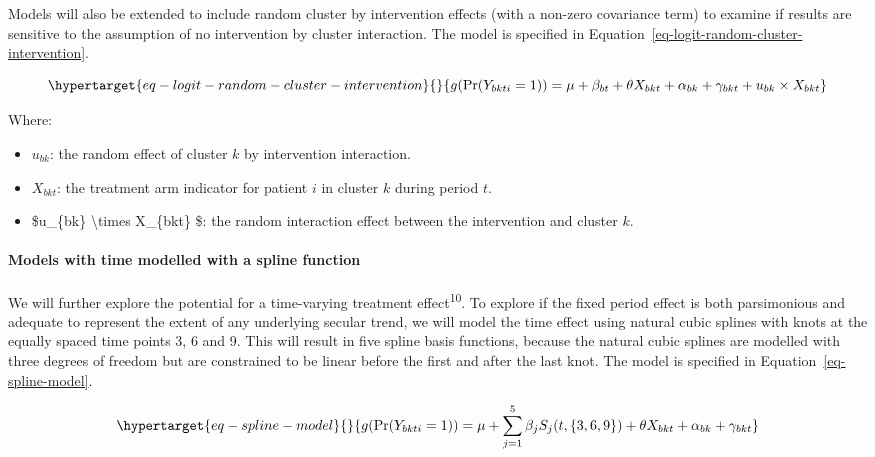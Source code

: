 \documentclass[
]{scrartcl}
\let\oldparagraph\paragraph
\renewcommand{\paragraph}[1]{\oldparagraph{#1}\mbox{}}
\providecommand{\tightlist}{%
  \setlength{\itemsep}{0pt}\setlength{\parskip}{0pt}}\usepackage{longtable,booktabs,array}
\begin{document}
Models will also be extended to include random cluster by intervention
effects (with a non-zero covariance term) to examine if results are
sensitive to the assumption of no intervention by cluster interaction.
The model is specified in
Equation~\ref{eq-logit-random-cluster-intervention}.

\begin{equation}\protect\hypertarget{eq-logit-random-cluster-intervention}{}{
g(\text{Pr}(Y_{bkti} = 1)) = \mu + \beta_{bt} + \theta X_{bkt} + \alpha_{bk} + \gamma_{bkt} + u_{bk} \times X_{bkt}
}\label{eq-logit-random-cluster-intervention}\end{equation}

Where:

\begin{itemize}
\tightlist
\item
  \(u_{bk}\): the random effect of cluster \(k\) by intervention
  interaction.
\item
  \(X_{bkt}\): the treatment arm indicator for patient \(i\) in cluster
  \(k\) during period \(t\).
\item
  \$u\_\{bk\} \textbackslash times X\_\{bkt\} \$: the random interaction
  effect between the intervention and cluster \(k\).
\end{itemize}

\hypertarget{models-with-time-modelled-with-a-spline-function}{%
\paragraph{Models with time modelled with a spline
function}\label{models-with-time-modelled-with-a-spline-function}}

We will further explore the potential for a time-varying treatment
effect\textsuperscript{10}. To explore if the fixed period effect is
both parsimonious and adequate to represent the extent of any underlying
secular trend, we will model the time effect using natural cubic splines
with knots at the equally spaced time points 3, 6 and 9. This will
result in five spline basis functions, because the natural cubic splines
are modelled with three degrees of freedom but are constrained to be
linear before the first and after the last knot. The model is specified
in Equation~\ref{eq-spline-model}.

\begin{equation}\protect\hypertarget{eq-spline-model}{}{
g(\text{Pr}(Y_{bkti} = 1)) = \mu + \sum_{j=1}^5 \beta_j S_j(t, \{3, 6, 9\}) + \theta X_{bkt} + \alpha_{bk} + \gamma_{bkt}
}\label{eq-spline-model}\end{equation}
\end{document}
